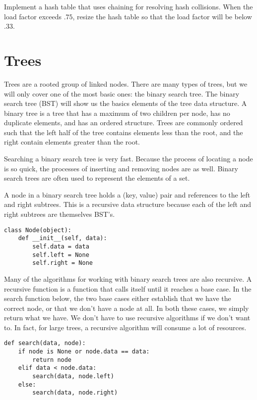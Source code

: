 \begin{problem}
Implement a hash table that uses chaining for resolving hash collisions.
When the load factor exceeds $.75$, resize the hash table so that the load factor will be below $.33$.
\end{problem}

\section*{Trees}
Trees are a rooted group of linked nodes.  There are many types of trees, but we will only cover one of the most basic ones: the binary search tree.
The binary search tree (BST) will show us the basics elements of the tree data structure.
A binary tree is a tree that has a maximum of two children per node,
has no duplicate elements, and has an ordered structure.
Trees are commonly ordered such that the left half of the tree contains elements less than the root, and the right contain elements greater than the root.

Searching a binary search tree is very fast.
Because the process of locating a node is so quick, the processes of inserting and removing nodes are as well.
Binary search trees are often used to represent the elements of a set.

A node in a binary search tree holds a (key, value) pair and references to the left and right subtrees.
This is a recursive data structure because each of the left and right subtrees are themselves BST's.
\begin{lstlisting}
class Node(object):
    def __init__(self, data):
        self.data = data
        self.left = None
        self.right = None
\end{lstlisting}
Many of the algorithms for working with binary search trees are also recursive.
A recursive function is a function that calls itself until it reaches a base case.
In the search function below, the two base cases either establish that we have the correct
node, or that we don't have a node at all.
In both these cases, we simply return what we have.
We don't have to use recursive algorithms if we don't want to.  In fact, for large trees, a recursive algorithm will consume a lot of resources.
\begin{lstlisting}
def search(data, node):
    if node is None or node.data == data:
        return node
    elif data < node.data:
        search(data, node.left)
    else:
        search(data, node.right)
\end{lstlisting}

